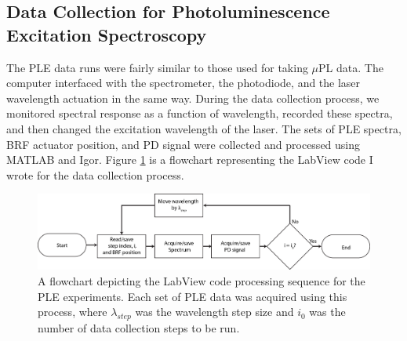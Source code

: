 \subsection{Data Collection for Photoluminescence Excitation Spectroscopy}
The PLE data runs were fairly similar to those used for taking $\mu$PL data. The computer interfaced with the spectrometer, the photodiode, and the laser wavelength actuation in the same way. During the data collection process, we monitored spectral response as a function of wavelength, recorded these spectra, and then changed the excitation wavelength of the laser. The sets of PLE spectra, BRF actuator position, and PD signal were collected and processed using MATLAB and Igor. Figure \ref{flowitple} is a flowchart representing the LabView code I wrote for the data collection process.

\begin{figure}[h!]
\centering
\includegraphics[width = 1\textwidth]{pleSoftflow.png}
\caption{ \doublespacing A flowchart depicting the LabView code processing sequence for the PLE experiments. Each set of PLE data was acquired using this process, where $\lambda_{step}$ was the wavelength step size and $i_0$ was the number of data collection steps to be run.}
\label{flowitple}
\end{figure}

